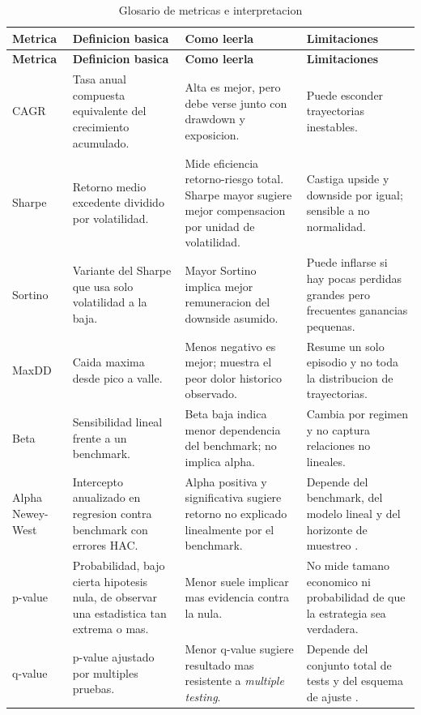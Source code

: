 \documentclass[11pt,letterpaper]{article}
\begin{document}
\begin{longtable}{>{\raggedright\arraybackslash}p{}>{\raggedright\arraybackslash}p{}>{\raggedright\arraybackslash}p{}>{\raggedright\arraybackslash}p{}}
\caption{Glosario de metricas e interpretacion}\label{tab:metrics-glossary}\\
\toprule
\textbf{Metrica} & \textbf{Definicion basica} & \textbf{Como leerla} & \textbf{Limitaciones} \\
\midrule
\endfirsthead
\toprule
\textbf{Metrica} & \textbf{Definicion basica} & \textbf{Como leerla} & \textbf{Limitaciones} \\
\midrule
\endhead
CAGR & Tasa anual compuesta equivalente del crecimiento acumulado. & Alta es mejor, pero debe verse junto con drawdown y exposicion. & Puede esconder trayectorias inestables. \\
Sharpe & Retorno medio excedente dividido por volatilidad. & Mide eficiencia retorno-riesgo total. Sharpe mayor sugiere mejor compensacion por unidad de volatilidad. & Castiga upside y downside por igual; sensible a no normalidad. \\
Sortino & Variante del Sharpe que usa solo volatilidad a la baja. & Mayor Sortino implica mejor remuneracion del downside asumido. & Puede inflarse si hay pocas perdidas grandes pero frecuentes ganancias pequenas. \\
MaxDD & Caida maxima desde pico a valle. & Menos negativo es mejor; muestra el peor dolor historico observado. & Resume un solo episodio y no toda la distribucion de trayectorias. \\
Beta & Sensibilidad lineal frente a un benchmark. & Beta baja indica menor dependencia del benchmark; no implica alpha. & Cambia por regimen y no captura relaciones no lineales. \\
Alpha Newey-West & Intercepto anualizado en regresion contra benchmark con errores HAC. & Alpha positiva y significativa sugiere retorno no explicado linealmente por el benchmark. & Depende del benchmark, del modelo lineal y del horizonte de muestreo \citep{neweyWest1987}. \\
p-value & Probabilidad, bajo cierta hipotesis nula, de observar una estadistica tan extrema o mas. & Menor suele implicar mas evidencia contra la nula. & No mide tamano economico ni probabilidad de que la estrategia sea verdadera. \\
q-value & p-value ajustado por multiples pruebas. & Menor q-value sugiere resultado mas resistente a \emph{multiple testing}. & Depende del conjunto total de tests y del esquema de ajuste \citep{benjaminiYekutieli2001}. \\

\end{longtable}
\end{document}
